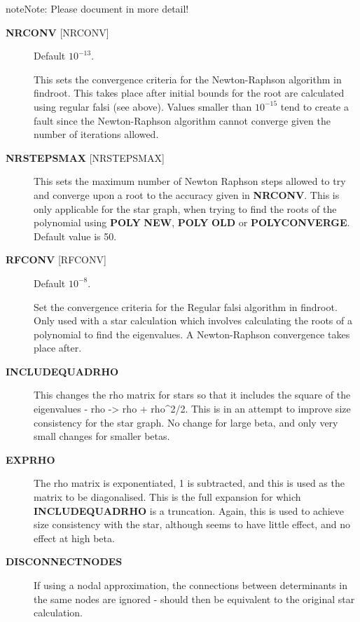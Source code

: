 \documentclass[openany,a4paper,10pt,english]{manual}
\begin{document}
\begin{notice}{note}{Note:}
Please document in more detail!
\end{notice}
\begin{description}
\item[\textbf{NRCONV} {[}NRCONV{]}] \leavevmode
Default $10^{-13}$.

This sets the convergence criteria for the Newton-Raphson algorithm
in findroot. This takes place after initial bounds for the root are
calculated using regular falsi (see above). Values smaller than
$10^{-15}$ tend to create a fault since the Newton-Raphson
algorithm cannot converge given the number of iterations allowed.

\item[\textbf{NRSTEPSMAX} {[}NRSTEPSMAX{]}] \leavevmode
This sets the maximum number of Newton Raphson steps allowed to try
and converge upon a root to the accuracy given in \textbf{NRCONV}. This
is only applicable for the star graph, when trying to find
the roots of the polynomial using \textbf{POLY} \textbf{NEW}, \textbf{POLY} \textbf{OLD} or
\textbf{POLYCONVERGE}. Default value is 50.

\item[\textbf{RFCONV} {[}RFCONV{]}] \leavevmode
Default $10^{-8}$.

Set the convergence criteria for the Regular falsi algorithm in
findroot. Only used with a star calculation which involves calculating
the roots of a polynomial to find the eigenvalues. A Newton-Raphson
convergence takes place after.

\item[\textbf{INCLUDEQUADRHO}] \leavevmode
This changes the rho matrix for stars so that it includes the square
of the eigenvalues - rho -\textgreater{} rho + rho\textasciicircum{}2/2. This is in an attempt to
improve size consistency for the star graph. No change for large beta,
and only very small changes for smaller betas.

\item[\textbf{EXPRHO}] \leavevmode
The rho matrix is exponentiated, 1 is subtracted, and this is used as
the matrix to be diagonalised. This is the full expansion for which
\textbf{INCLUDEQUADRHO} is a truncation. Again, this is used to achieve
size consistency with the star, although seems to have little effect,
and no effect at high beta.

\item[\textbf{DISCONNECTNODES}] \leavevmode
If using a nodal approximation, the connections between determinants
in the same nodes are ignored - should then be equivalent to the
original star calculation.


\end{description}
\end{document}
